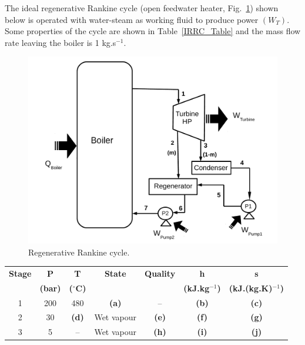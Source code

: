 \documentclass[calculator,steamtables,refrigeranttables,psychrometricchart,datasheet,resit]{exam}
\begin{document}
\begin{question}
The ideal regenerative Rankine cycle (open feedwater heater, Fig.~\ref{exam2_Q3_rankinecycle}) shown below is operated with water-steam as working fluid to produce power $\left(W_{T}\right)$. Some properties of the cycle are shown in Table~\ref{IRRC_Table} and the mass flow rate leaving the boiler is 1 kg.s$^{-1}$.
      \begin{figure}[h]
      \begin{center}
      \includegraphics[width=10.cm,clip]{./Pics/Exam_Reheat_Regenerative2_Rankine_Cycle}
      \caption{Regenerative Rankine cycle.}
      \label{exam2_Q3_rankinecycle}
     \end{center} 
     \end{figure}
\begin{table}[b]
\begin{center}
\begin{tabular}{c | c c c c c c} 
\hline
{\bf Stage} & {\bf P}       & {\bf T}            &  {\bf State}  &  {\bf Quality}  & {\bf h}             & {\bf s}                  \\
            & {\bf (bar)}   & {\bf ($^{\circ}$C)} &               &                 &{\bf (kJ.kg$^{-1}$)}  & {\bf (kJ.(kg.K)$^{-1}$)}  \\
\hline
1           &  200          & 480                &  {\bf (a)}    &   --            & {\bf (b)}           & {\bf (c)}                 \\
2           &  30           & {\bf (d)}          &  Wet vapour   & {\bf (e)}       & {\bf (f)}           & {\bf (g)}                \\
3           &  5            & --                 &  Wet vapour   & {\bf (h)}       & {\bf (i)}           & {\bf (j)}                \\

\end{tabular}
\end{center}
\end{table}
\end{question}
\end{document}
